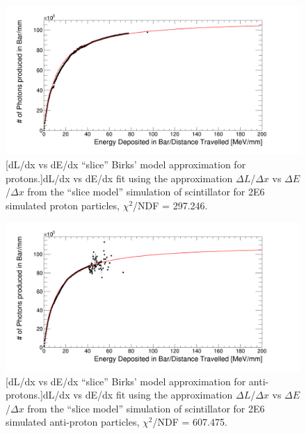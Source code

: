 \begin{figure}[htbp]
 \centering
 \includegraphics[width=\linewidth]{Appendix4/Figs/newNewDldxVsDeDx/protonDeDxDlDx.png}
 [dL/dx vs dE/dx ``slice'' Birks' model approximation for protons.]{dL/dx vs dE/dx fit using the approximation $\Delta L$/$\Delta x$ vs $\Delta E$/$\Delta x$ from the ``slice model'' simulation of scintillator for 2E6 simulated proton particles, $\chi^2$/NDF = 297.246.} 
 \label{fig:slice_Proton_dl_dx}
\end{figure}

\begin{figure}[htbp]
 \centering
 \includegraphics[width=\linewidth]{Appendix4/Figs/newNewDldxVsDeDx/antiProtonDeDxDlDx.png}
 [dL/dx vs dE/dx ``slice'' Birks' model approximation for anti-protons.]{dL/dx vs dE/dx fit using the approximation $\Delta L$/$\Delta x$ vs $\Delta E$/$\Delta x$ from the ``slice model'' simulation of scintillator for 2E6 simulated anti-proton particles, $\chi^2$/NDF = 607.475.} 
 \label{fig:slice_AProton_dl_dx}
\end{figure}

